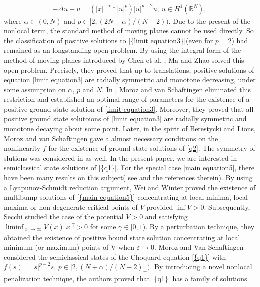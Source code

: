 \documentclass[12pt,reqno]{amsart}
\numberwithin{equation}{section}
\begin{document}
\begin{eqnarray}\label{limit equation3}
-\Delta u+u=(|x|^{-\alpha}\ast |u|^{p}) |u|^{p-2}u, \ u\in H^1({\mathbb R}^{N}),
\end{eqnarray}
where ${\alpha}\in(0,N)$ and $p\in[2,(2N-{\alpha})/(N-2))$. Due to the present of the nonlocal term, the standard
method of moving planes cannot be used directly. So the classification of positive solutions to {\eqref{{limit equation3}}}(even for $p=2$)
had remained as an longstanding open problem. By using the integral form of the
method of moving planes introduced by Chen et al. \cite{Chen}, Ma and Zhao\cite{MZ} solved this open problem. Precisely, they proved that up to translations,
positive solutions of equation \eqref{limit equation3} are radially symmetric and monotone decreasing, under some assumption on $\alpha$, $p$ and $N$. In \cite{MV3}, Moroz and van Schaftingen eliminated this restriction and established an optimal range of parameters for the existence of a positive
ground state solution of \eqref{limit equation3}. Moreover, they proved that all positive ground state solutoions of \eqref{limit equation3} are
radially symmetric and monotone decaying about some point. Later, in the spirit of Berestycki and Lions, Moroz and van Schaftingen\cite{MV1} gave a almost necessary conditions on the nonlinearity $f$ for the existence of ground state solutions of \eqref{q2}. The symmetry of slutions was considered in \cite{MV1} as well.
\vskip0.1in
In the present paper, we are interested in semiclassical state solutions of {\eqref{{q1}}}. For the special case \eqref{main equation5}, there have been many results
on this subject( see \cite{CSS, MN, Nolasco, Secchi, WW} and the references therein). By using a Lyapunov-Schmidt
reduction argument, Wei and Winter\cite{WW} proved the existence
of multibump solutions of {\eqref{{main equation5}}} concentrating at local minima, local maxima
or non-degenerate critical points of $V$ provided $\inf V>0$. Subsequently, Secchi\cite{Secchi} studied the case of the
potential $V>0$ and satisfying $\liminf_{|x|{\rightarrow}{\infty}}V(x)|x|^{\gamma}>0$ for some ${\gamma}\in[0,1)$. By a perturbation technique, they obtained the existence of
positive bound state solution concentrating at local minimum (or maximum) points of V when ${\varepsilon}\rightarrow 0$.
Moroz and Van Schaftingen \cite{MV2} considered the semiclassical states of the Choquard equation {\eqref{{q1}}} with $f(s)=|s|^{p-2}s$,
$p\in[2,(N+{\alpha})/(N-2)_+)$. By introducing a novel nonlocal penalization technique, the authors proved that {\eqref{{q1}}} has a family of solutions
\end{document}
